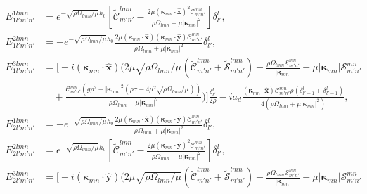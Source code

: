 \documentclass[aps,pre,amsmath,amssymb,floatfix,onecolumn,notitlepage,10pt]{revtex4-1}
\begin{document}
\begin{align}
E_{1l'm'n'}^{1lmn} &= e^ {-\sqrt{{\rho  \Omega _{l m n}}/{\mu }}h_0}\left[ \tilde{\mathcal{C}}_{m' n'}^{l m n}-\frac{2 \mu  \left( \bm{\kappa}_{mn}\cdot\hat{\mathbf{x}} \right)^2 \mathcal{C}_{m' n'}^{m n}}{\rho  \Omega _{l m n}+\mu  \left\lvert \bm{\kappa}_{m n} \right\rvert^2}\right] \delta^l_{l'}, \\
E_{1l'm'n'}^{2lmn} &=-e^ {-\sqrt{{\rho  \Omega _{l m n}}/{\mu }}h_0}\frac{2 \mu  \left( \bm{\kappa}_{mn}\cdot\hat{\mathbf{x}} \right) \left( \bm{\kappa}_{mn}\cdot\hat{\mathbf{y}} \right) \mathcal{C}_{m' n'}^{m n}}{\rho  \Omega _{l m n}+\mu  \left\lvert \bm{\kappa}_{m n} \right\rvert^2} \delta^l_{l'},  \\
E_{1l'm'n'}^{3lmn} &=\Bigg[-i \left( \bm{\kappa}_{mn}\cdot\hat{\mathbf{x}} \right) \Big(2 \mu  \sqrt{{\rho  \Omega _{l m n}}/{\mu }} \left(\tilde{\mathcal{C}}_{m' n'}^{l m n}+\tilde{\mathcal{S}}_{m' n'}^{l m n}\right)-\frac{\rho  \Omega _{l m n} \mathcal{S}_{m' n'}^{m n}}{\left\lvert \bm{\kappa}_{m n} \right\rvert}-\mu  \left\lvert \bm{\kappa}_{m n} \right\rvert \mathcal{S}_{m' n'}^{m n} \nonumber \\
&\quad + \frac{\mathcal{C}_{m' n'}^{m n} \left(g \rho ^2+\left\lvert \bm{\kappa}_{m n} \right\rvert^2 \left(\rho  \sigma -4 \mu ^2 \sqrt{{\rho  \Omega _{l m n}}/{\mu }}\right)\right)}{\rho  \Omega _{l m n}+\mu  \left\lvert \bm{\kappa}_{m n} \right\rvert^2}\Big)\Bigg] \frac{\delta^l_{l'}}{2\rho} - i a_d \frac{\left( \bm{\kappa}_{mn}\cdot\hat{\mathbf{x}} \right) \mathcal{C}_{m' n'}^{m n} \rho \left(\delta^l_{l'+1}+\delta^l_{l'-1}\right)}{4\left(\rho  \Omega _{l m n}+\mu  \left\lvert \bm{\kappa}_{m n} \right\rvert^2\right)},  \\
E_{2l'm'n'}^{1lmn} &= -e^ {-\sqrt{{\rho  \Omega _{l m n}}/{\mu }}h_0}\frac{2 \mu  \left( \bm{\kappa}_{mn}\cdot\hat{\mathbf{x}} \right) \left( \bm{\kappa}_{mn}\cdot\hat{\mathbf{y}} \right) \mathcal{C}_{m' n'}^{m n}}{\rho  \Omega _{l m n}+\mu  \left\lvert \bm{\kappa}_{m n} \right\rvert^2} \delta^l_{l'}, \\
E_{2l'm'n'}^{2lmn} &=e^ {-\sqrt{{\rho  \Omega _{l m n}}/{\mu }}h_0}\left[\tilde{\mathcal{C}}_{m' n'}^{l m n}-\frac{2 \mu  \left( \bm{\kappa}_{mn}\cdot\hat{\mathbf{y}} \right)^2 \mathcal{C}_{m' n'}^{m n}}{\rho  \Omega _{l m n}+\mu  \left\lvert \bm{\kappa}_{m n} \right\rvert^2}\right] \delta^l_{l'}, \\
E_{2l'm'n'}^{3lmn} &=\Bigg[-i \left( \bm{\kappa}_{mn}\cdot\hat{\mathbf{y}} \right) \Bigg(2 \mu  \sqrt{{\rho  \Omega _{l m n}}/{\mu }} \left(\tilde{\mathcal{C}}_{m' n'}^{l m n}+\tilde{\mathcal{S}}_{m' n'}^{l m n}\right)-\frac{\rho  \Omega _{l m n} \mathcal{S}_{m' n'}^{m n}}{\left\lvert \bm{\kappa}_{m n} \right\rvert}-\mu  \left\lvert \bm{\kappa}_{m n} \right\rvert \mathcal{S}_{m' n'}^{m n} \nonumber \\

\end{align}
\end{document}

